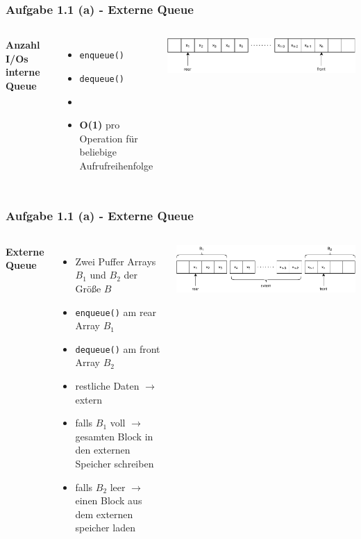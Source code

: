 \documentclass[aspectratio=169]{beamer}
\begin{document}
\begin{frame}
\frametitle{Aufgabe 1.1 (a) - Externe Queue}
\begin{columns}[c] %
	
	\textbf{Anzahl I/Os interne Queue}
	\begin{itemize}
		\item \texttt{enqueue()}
		\item \texttt{dequeue()}
		\item[]
		\item \textbf{O(1)} pro Operation für beliebige Aufrufreihenfolge 
	\end{itemize}
	
	\includegraphics[scale=.5]{queue0.pdf}
	
\end{columns}
\end{frame}




\begin{frame}
	\frametitle{Aufgabe 1.1 (a) - Externe Queue}
	\begin{columns}[c] %
	
	\textbf{Externe Queue}
	\begin{itemize}
		\item Zwei Puffer Arrays $B_1$ und $B_2$ der Größe $B$
		\item \texttt{enqueue()} am rear Array $B_1$
		\item \texttt{dequeue()} am front Array $B_2$
		\item restliche Daten $\rightarrow$ extern
		\item falls $B_1$ voll $\rightarrow$ gesamten Block in den externen Speicher schreiben
		\item falls $B_2$ leer $\rightarrow$ einen Block aus dem externen speicher laden
	\end{itemize}
	
	\includegraphics[scale=.5]{queue1.pdf}
	
	\end{columns}
	\end{frame}
\end{document}
